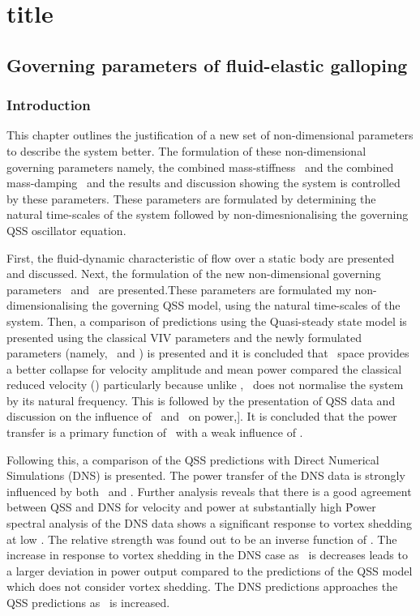 \part{title}\chapter{Governing parameters of  fluid-elastic galloping}
\label{chap:goven_para}

\section{Introduction}

This chapter outlines the justification of a new set of non-dimensional parameters to describe the system better. The formulation of these non-dimensional governing parameters namely, the combined mass-stiffness \massstiff \ and the combined mass-damping \massdamp \ and the results and discussion showing the system is controlled by these parameters. These parameters are formulated by determining the natural time-scales of the system followed by non-dimesnionalising the governing QSS oscillator equation.  

First, the fluid-dynamic characteristic of flow over a static body are presented and discussed. Next, the formulation of the new non-dimensional governing parameters \massstiff\ and \massdamp\ are presented.These parameters are formulated my non-dimensionalising the governing QSS model, using the natural time-scales of the system. Then, a comparison of predictions using the Quasi-steady state model is presented using the classical VIV parameters and the newly formulated parameters (namely, \massstiff \ and \massdamp) is presented and it is concluded that \massdamp\ space provides a better collapse for velocity amplitude and mean power compared the classical reduced velocity (\ustar) particularly because unlike \ustar, \massdamp\ does not normalise the system by its natural frequency. This is followed by the presentation of QSS data and discussion on the influence of \massstiff \ and \massdamp \ on power,]. It is concluded that the power transfer is a primary function of \massdamp \ with a weak influence of \massstiff.

Following this, a comparison of the QSS predictions with Direct Numerical Simulations (DNS) is presented. The power transfer of the DNS data is strongly influenced by both \massstiff \ and \massdamp. Further analysis reveals that there is a good agreement between QSS and DNS for velocity and power at substantially high \massstiff\. Power spectral analysis of the DNS data shows a significant response to vortex shedding at low \massstiff. The relative strength was found out to be an inverse function of \massstiff. The increase in response to vortex shedding in the DNS case as \massstiff\ is decreases leads to a larger deviation in power output compared to the predictions of the QSS model which does not consider vortex shedding. The DNS predictions approaches the QSS predictions as \massstiff\ is increased.  


